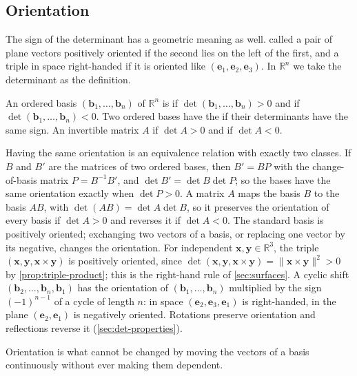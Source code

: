 \subsection{Orientation}

The sign of the determinant has a geometric meaning as well.  called a pair of plane vectors positively oriented if the second lies on the left of the first, and a triple in space right-handed if it is oriented like $(\mathbf e_1,\mathbf e_2,\mathbf e_3)$. In $\mathbb R^n$ we take the determinant as the definition.

\begin{definition}[Orientation]
\label{def:orientation}
An ordered basis $(\mathbf b_1,\ldots,\mathbf b_n)$ of $\mathbb R^n$ is  if $\det(\mathbf b_1,\ldots,\mathbf b_n)>0$ and  if $\det(\mathbf b_1,\ldots,\mathbf b_n)<0$. Two ordered bases have the  if their determinants have the same sign. An invertible matrix $A$  if $\det A>0$ and  if $\det A<0$.
\end{definition}

Having the same orientation is an equivalence relation with exactly two classes. If $B$ and $B'$ are the matrices of two ordered bases, then $B'=BP$ with the change-of-basis matrix $P=B^{-1}B'$, and $\det B'=\det B\det P$; so the bases have the same orientation exactly when $\det P>0$. A matrix $A$ maps the basis $B$ to the basis $AB$, with $\det(AB)=\det A\det B$, so it preserves the orientation of every basis if $\det A>0$ and reverses it if $\det A<0$. The standard basis is positively oriented; exchanging two vectors of a basis, or replacing one vector by its negative, changes the orientation. For independent $\mathbf x,\mathbf y\in\mathbb R^3$, the triple $(\mathbf x,\mathbf y,\mathbf x\times\mathbf y)$ is positively oriented, since $\det(\mathbf x,\mathbf y,\mathbf x\times\mathbf y)=\|\mathbf x\times\mathbf y\|^2>0$ by \cref{prop:triple-product}; this is the right-hand rule of \cref{sec:surfaces}. A cyclic shift $(\mathbf b_2,\ldots,\mathbf b_n,\mathbf b_1)$ has the orientation of $(\mathbf b_1,\ldots,\mathbf b_n)$ multiplied by the sign $(-1)^{n-1}$ of a cycle of length $n$: in space $(\mathbf e_2,\mathbf e_3,\mathbf e_1)$ is right-handed, in the plane $(\mathbf e_2,\mathbf e_1)$ is negatively oriented. Rotations preserve orientation and reflections reverse it (\cref{sec:det-properties}).

Orientation is what cannot be changed by moving the vectors of a basis continuously without ever making them dependent.

